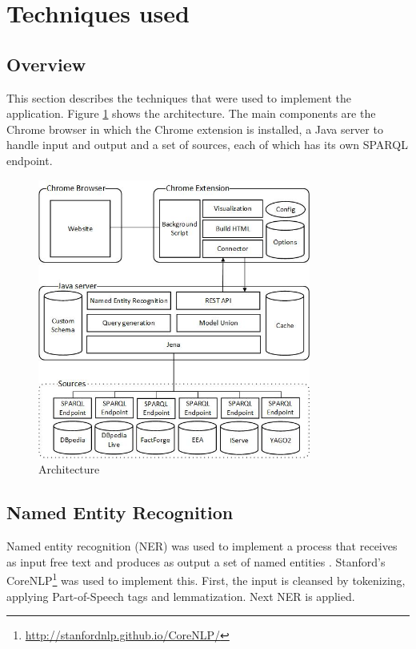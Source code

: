 \section{Techniques used} 

\subsection{Overview}
This section describes the techniques that were used to implement the application. Figure \ref{fig:architecture} shows the architecture. The main components are the Chrome browser in which the Chrome extension is installed, a Java server to handle input and output and a set of sources, each of which has its own SPARQL endpoint. 


\begin{figure}[ht]
	\centering
	\includegraphics[width=0.8\textwidth]{img/Architecture_v2}
	\caption{Architecture}
	\label{fig:architecture}
\end{figure}


%


\subsection{Named Entity Recognition}
Named entity recognition (NER) was used to implement a process that receives as input free text and produces as output a set of named entities \cite{NERTutorial}. Stanford's CoreNLP\footnote{\url{http://stanfordnlp.github.io/CoreNLP/}} was used to implement this. First, the input is cleansed by tokenizing, applying Part-of-Speech tags and lemmatization. Next NER is applied. 

